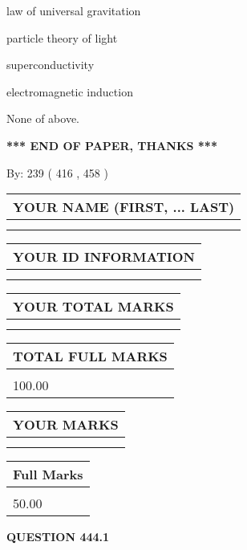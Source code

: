 \documentclass[12pt]{article}
\begin{document}
 
law of universal gravitation
 
 
particle theory of light
 
 
superconductivity
 
 
electromagnetic induction
 
 
 None of above.
 
 
   
   
\vspace{1.0in} 
{\textbf{\large{ *** END OF PAPER, THANKS *** }}} 
   
   
\hspace{1.0in} By: 
 239 ( 416 ,  458 )
   
   
   
   
\newpage 
\setcounter{page}{ 
   444001 } 
   
   
   
   
\noindent\begin{tabular}{|l|}
\hline
YOUR NAME (FIRST, ... LAST)  \\
\hline
 \\ 
 \\ 
\hline
\end{tabular}
\hspace{0.05in} \begin{tabular}{|l|}
\hline
 YOUR   ID   INFORMATION  \\
\hline
 \\ 
 \\ 
\hline
\end{tabular}
   
   
\vspace{0.2in}\noindent\begin{tabular}{|l|}
\hline
YOUR TOTAL MARKS  \\
\hline
 \\ 
 \\ 
\hline
\end{tabular}
\hspace{0.05in} \begin{tabular}{|l|}
\hline
TOTAL FULL MARKS  \\
\hline
 \\ 
100.00 \\
\hline
\end{tabular}
  
\vspace{0.2in}
  
\noindent\begin{tabular}{|l|}
\hline
 YOUR MARKS  \\
\hline
 \\ 
 \\ 
\hline
\end{tabular}
\hspace{0.05in} \begin{tabular}{|l|}
\hline
 Full Marks  \\
\hline
 \\ 
50.00 \\
\hline
\end{tabular}
{\textbf{\Large{QUESTION
444.1 
}}}
  
\end{document}
